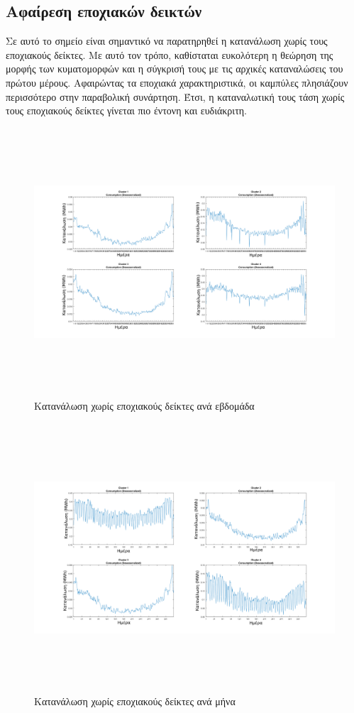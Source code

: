 \subsection{Αφαίρεση εποχιακών δεικτών}
Σε αυτό το σημείο είναι σημαντικό να παρατηρηθεί η κατανάλωση χωρίς τους εποχιακούς δείκτες. Με αυτό τον τρόπο, καθίσταται ευκολότερη η θεώρηση της μορφής των κυματομορφών και η σύγκρισή τους με τις αρχικές καταναλώσεις του πρώτου μέρους. Αφαιρώντας τα εποχιακά χαρακτηριστικά, οι καμπύλες πλησιάζουν περισσότερο στην παραβολική συνάρτηση. Έτσι, η καταναλωτική τους τάση χωρίς τους εποχιακούς δείκτες γίνεται πιο έντονη και ευδιάκριτη.\par

\begin{figure}[ht!]
\centering
\includegraphics[width=180mm, height=100mm]{../../plots/Trend_estimation/Deseasonalized_ALL.png}
\caption{Κατανάλωση χωρίς εποχιακούς δείκτες ανά εβδομάδα}
\label{fig:deseason week}
\end{figure}

\begin{figure}[ht!]
\centering
\includegraphics[width=180mm, height=100mm]{../../plots/Trend_estimation/Deseasonalized_month_ALL.png}
\caption{Κατανάλωση χωρίς εποχιακούς δείκτες ανά μήνα}
\label{fig:deseason month}
\end{figure}
\newpage
